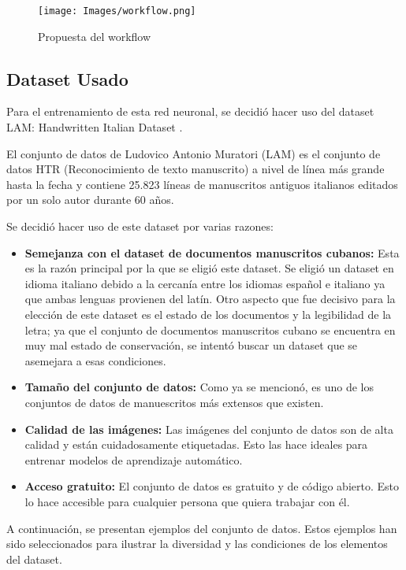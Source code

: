 \documentclass{article}
\begin{document}
\begin{figure}[h]
    \centering
    \texttt{[image: Images/workflow.png]}
    \caption{Propuesta del workflow}
    \label{fig:enter-label}
\end{figure}



\newpage
\subsection{Dataset Usado}
Para el entrenamiento de esta red neuronal, se decidió hacer uso del dataset LAM: Handwritten Italian Dataset \cite{17}. 

El conjunto de datos de Ludovico Antonio Muratori (LAM) es el conjunto de datos HTR (Reconocimiento de texto manuscrito) a nivel de línea más grande hasta la fecha y contiene 25.823 líneas de manuscritos antiguos italianos editados por un solo autor durante 60 años.

Se decidió hacer uso de este dataset por varias razones:
\begin{itemize}

    \item \textbf{Semejanza con el dataset de documentos manuscritos cubanos:} Esta es la razón principal por la que se eligió este dataset. Se eligió un dataset en idioma italiano debido a la cercanía entre los idiomas español e italiano ya que ambas lenguas provienen del latín. Otro aspecto que fue decisivo para la elección de este dataset es el estado de los documentos y la legibilidad de la letra; ya que el conjunto de documentos manuscritos cubano se encuentra en muy mal estado de conservación, se intentó buscar un dataset que se asemejara a esas condiciones.
    \item \textbf{Tamaño del conjunto de datos: } Como ya se mencionó, es uno de los conjuntos de datos de manuescritos más extensos que existen.

    \item \textbf{Calidad de las imágenes: } Las imágenes del conjunto de datos son de alta calidad y están cuidadosamente etiquetadas. Esto las hace ideales para entrenar modelos de aprendizaje automático.

    \item \textbf{Acceso gratuito: } El conjunto de datos es gratuito y de código abierto. Esto lo hace accesible para cualquier persona que quiera trabajar con él.
\end{itemize}

A continuación, se presentan ejemplos del conjunto de datos. Estos ejemplos han sido seleccionados para ilustrar la diversidad y las condiciones de los elementos del dataset.
\end{document}
